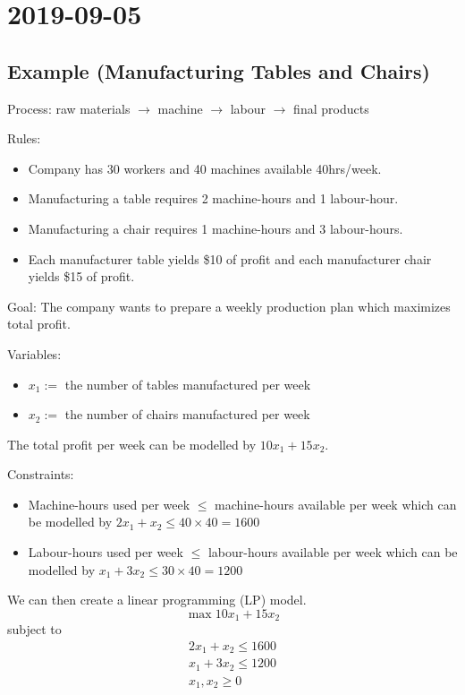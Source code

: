 \section{2019-09-05}
\subsection{Example (Manufacturing Tables and Chairs)}
Process: raw materials $\rightarrow$ machine $\rightarrow$ labour $\rightarrow$ final products

Rules:
\begin{itemize}
    \item Company has 30 workers and 40 machines available 40hrs/week.
    \item Manufacturing a table requires 2 machine-hours and 1 labour-hour.
    \item Manufacturing a chair requires 1 machine-hours and 3 labour-hours.
    \item Each manufacturer table yields \$10 of profit and each manufacturer chair yields \$15 of profit.
\end{itemize}

Goal: The company wants to prepare a weekly production plan which maximizes
total profit.

Variables:
\begin{itemize}
    \item $x_1:=$ the number of tables manufactured per week
    \item $x_2:=$ the number of chairs manufactured per week
\end{itemize}

The total profit per week can be modelled by $10x_1 + 15x_2$.

Constraints:
\begin{itemize}
    \item Machine-hours used per week $\le$  machine-hours available per week which
can be modelled by $2x_1 + x_2 \le  40 \times 40 = 1600$
    \item Labour-hours used per week $\le$ labour-hours available per week which can
    be modelled by $x_1 + 3x_2 \le 30 \times 40 = 1200$
\end{itemize}

We can then create a linear programming (LP) model.
\[\max 10x_1 + 15x_2\]
subject to
\begin{align*}
    2x_1 + x_2 \le 1600\\
    x_1 + 3x_2 \le 1200\\
    x_1, x_2 \ge 0
\end{align*}

